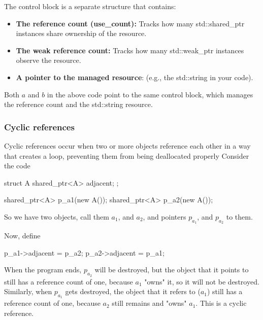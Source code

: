 \documentclass{report}
\begin{document}
\bigbreak \noindent 
The control block is a separate structure that contains:
\begin{itemize}
    \item \textbf{The reference count (use\_count):} Tracks how many std::shared\_ptr instances share ownership of the resource.
    \item \textbf{The weak reference count:} Tracks how many std::weak\_ptr instances observe the resource.
    \item \textbf{A pointer to the managed resource}: (e.g., the std::string in your code).
\end{itemize}
\bigbreak \noindent 
Both $a$ and $b$ in the above code point to the same control block, which manages the reference count and the std::string resource.
\bigbreak \noindent 
\subsubsection{Cyclic references}
\bigbreak \noindent 
Cyclic references occur when two or more objects reference each other in a way that creates a loop, preventing them from being deallocated properly
\bigbreak \noindent 
Consider the code
\bigbreak \noindent 
\begin{cppcode}
struct A {
    shared_ptr<A> adjacent;
};

shared_ptr<A> p_a1(new A());
shared_ptr<A> p_a2(new A());
\end{cppcode}
\bigbreak \noindent 
So we have two objects, call them $a_{1}$, and $a_{2}$, and pointers $p_{a_1}$, and $p_{a_2}$ to them.
\bigbreak \noindent 
\begin{figure}[ht]
    \centering
    \label{fig:shared2}
\end{figure}
\bigbreak \noindent 
Now, define
\bigbreak \noindent 
\begin{cppcode}
    p_a1->adjacent = p_a2;
    p_a2->adjacent = p_a1;
\end{cppcode}
\bigbreak \noindent 
\begin{figure}[ht]
    \centering
    \label{fig:shared3}
\end{figure}
\bigbreak \noindent 
When the program ends, $p_{a_2}$ will be destroyed, but the object that it points to still has a reference count of one, because $a_1$ "owns" it, so it will not be destroyed. Similarly, when $p_a_1$ gets destroyed, the object that it refers to ($a_1$) still has a reference count of one, because $a_2$ still remains and "owns" $a_1$. This is a cyclic reference.
\bigbreak \noindent 
\end{document}
